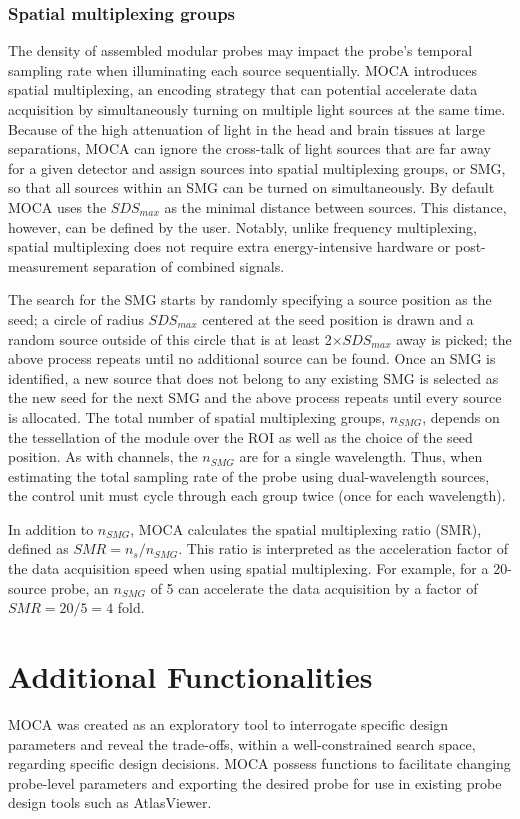 \subsubsection{Spatial multiplexing groups}
The density of assembled modular probes may impact the probe's temporal sampling rate when illuminating each source sequentially. MOCA introduces spatial multiplexing, an encoding strategy that can potential accelerate data acquisition by simultaneously turning on multiple light sources at the same time. Because of the high attenuation of light in the head and brain tissues at large separations, MOCA can ignore the cross-talk of light sources that are far away for a given detector and assign sources into spatial multiplexing groups, or SMG, so that all sources within an SMG can be turned on simultaneously. By default MOCA uses the $SDS_{max}$ as the minimal distance between sources. This distance, however, can be defined by the user. Notably, unlike frequency multiplexing, spatial multiplexing does not require extra energy-intensive hardware or post-measurement separation of combined signals. 

The search for the SMG starts by randomly specifying a source position as the seed; a circle of radius $SDS_{max}$ centered at the seed position is drawn and a random source outside of this circle that is at least 2$\times SDS_{max}$ away is picked; the above process repeats until no additional source can be found. Once an SMG is identified, a new source that does not belong to any existing SMG is selected as the new seed for the next SMG and the above process repeats until every source is allocated. The total number of spatial multiplexing groups, $n_{SMG}$, depends on the tessellation of the module over the ROI as well as the choice of the seed position. As with channels, the $n_{SMG}$ are for a single wavelength. Thus, when estimating the total sampling rate of the probe using dual-wavelength sources, the control unit must cycle through each group twice (once for each wavelength).

In addition to $n_{SMG}$, MOCA calculates the spatial multiplexing ratio (SMR), defined as $SMR=n_s/n_{SMG}$. This ratio is interpreted as the acceleration factor of the data acquisition speed when using spatial multiplexing. For example, for a 20-source probe, an $n_{SMG}$ of 5 can accelerate the data acquisition by a factor of $SMR=20/5=4$ fold.



\section{Additional Functionalities}
\label{sec:features}
MOCA was created as an exploratory tool to interrogate specific design parameters and reveal the trade-offs, within a well-constrained search space, regarding specific design decisions. MOCA possess functions to facilitate changing probe-level parameters and exporting the desired probe for use in existing probe design tools such as AtlasViewer.

